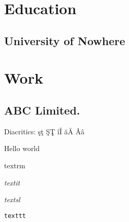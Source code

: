 \documentclass{my_cv}
\begin{document}
\section{Education}
\subsection{University of Nowhere}

\section{Work}
\subsection{ABC Limited.}

Diacritics: şţ ŞŢ îÎ ăĂ Ââ

Hello world

\textrm{textrm}

\textit{textit}

\textsl{textsl}

\texttt{texttt}
\end{document}
